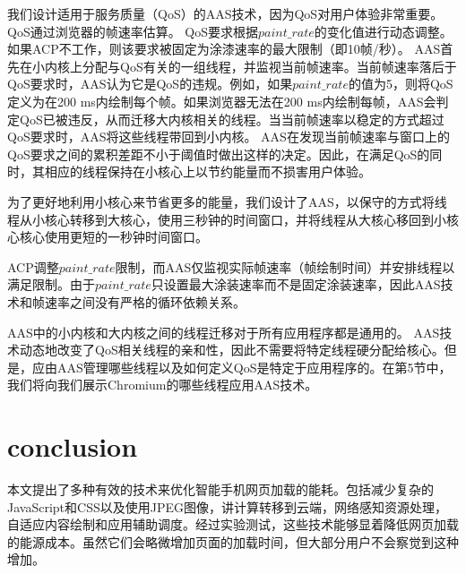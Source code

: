 \documentclass{sig-alternate-05-2015}
\begin{document}
我们设计适用于服务质量（QoS）的AAS技术，因为QoS对用户体验非常重要。 QoS通过浏览器的帧速率估算。 QoS要求根据$paint\_rate$的变化值进行动态调整。如果ACP不工作，则该要求被固定为涂漆速率的最大限制（即10帧/秒）。 AAS首先在小内核上分配与QoS有关的一组线程，并监视当前帧速率。当前帧速率落后于QoS要求时，AAS认为它是QoS的违规。例如，如果$paint\_rate$的值为5，则将QoS定义为在200 ms内绘制每个帧。如果浏览器无法在200 ms内绘制每帧，AAS会判定QoS已被违反，从而迁移大内核相关的线程。当当前帧速率以稳定的方式超过QoS要求时，AAS将这些线程带回到小内核。 AAS在发现当前帧速率与窗口上的QoS要求之间的累积差距不小于阈值时做出这样的决定。因此，在满足QoS的同时，其相应的线程保持在小核心上以节约能量而不损害用户体验。

为了更好地利用小核心来节省更多的能量，我们设计了AAS，以保守的方式将线程从小核心转移到大核心，使用三秒钟的时间窗口，并将线程从大核心移回到小核心核心使用更短的一秒钟时间窗口。

ACP调整$paint\_rate$限制，而AAS仅监视实际帧速率（帧绘制时间）并安排线程以满足限制。由于$paint\_rate$只设置最大涂装速率而不是固定涂装速率，因此AAS技术和帧速率之间没有严格的循环依赖关系。

AAS中的小内核和大内核之间的线程迁移对于所有应用程序都是通用的。 AAS技术动态地改变了QoS相关线程的亲和性，因此不需要将特定线程硬分配给核心。但是，应由AAS管理哪些线程以及如何定义QoS是特定于应用程序的。在第5节中，我们将向我们展示Chromium的哪些线程应用AAS技术。

\section{conclusion}

本文提出了多种有效的技术来优化智能手机网页加载的能耗。包括减少复杂的JavaScript和CSS以及使用JPEG图像，讲计算转移到云端，网络感知资源处理，自适应内容绘制和应用辅助调度。经过实验测试，这些技术能够显着降低网页加载的能源成本。虽然它们会略微增加页面的加载时间，但大部分用户不会察觉到这种增加。
\end{document}
